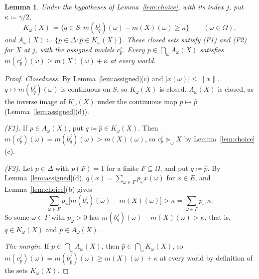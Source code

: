 \documentclass[11pt]{article}
\newtheorem{lemma}[theorem]{Lemma}
\theoremstyle{definition}
\begin{document}
\begin{lemma}\label{lem:witnesses}
Under the hypotheses of Lemma~\ref{lem:choice}, with its index $j$, put $\kappa\coloneqq\gamma/2$,
\[
K_\omega(X)\coloneqq\bigl\{q\in S:m(b^j_q)(\omega)-m(X)(\omega)\ge \kappa\bigr\}\qquad(\omega\in\Omega),
\]
{\color{red}and $A_\omega(X)\coloneqq\{p\in\Delta:\hat p\in K_\omega(X)\}$. These closed sets satisfy (F1) and (F2) for $X$ at $j$, with the assigned models $c^j_p$. Every $p\in\bigcap_\omega A_\omega(X)$ satisfies $m(c^j_p)(\omega)\ge m(X)(\omega)+\kappa$ at every world.}
\end{lemma}
\begin{proof}
\emph{Closedness.} By Lemma~\ref{lem:assigned}(c) and $|x(\omega)|\le\|x\|$, $q\mapsto m(b^j_q)(\omega)$ is continuous on $S$; so $K_\omega(X)$ is closed. {\color{red}$A_\omega(X)$ is closed, as the inverse image of $K_\omega(X)$ under the continuous map $p\mapsto\hat p$ (Lemma~\ref{lem:assigned}(d)).}

{\color{red}\emph{(F1).} If $p\in A_\omega(X)$, put $q\coloneqq\hat p\in K_\omega(X)$. Then $m(c^j_p)(\omega)=m(b^j_q)(\omega)>m(X)(\omega)$, so $c^j_p\succeq_\omega X$ by Lemma~\ref{lem:choice}(c).

\emph{(F2).} Let $p\in\Delta$ with $p(F)=1$ for a finite $F\subseteq\Omega$, and put $q\coloneqq\hat p$. By Lemma~\ref{lem:assigned}(d), $q(x)=\sum_{\omega\in F}p_\omega x(\omega)$ for $x\in E$, and Lemma~\ref{lem:choice}(b) gives
\[
\sum_{\omega\in F}p_\omega\bigl[m(b^j_q)(\omega)-m(X)(\omega)\bigr]>\kappa=\sum_{\omega\in F}p_\omega\,\kappa .
\]
So some $\omega\in F$ with $p_\omega>0$ has $m(b^j_q)(\omega)-m(X)(\omega)>\kappa$, that is, $q\in K_\omega(X)$ and $p\in A_\omega(X)$.

\emph{The margin.} If $p\in\bigcap_\omega A_\omega(X)$, then $\hat p\in\bigcap_\omega K_\omega(X)$, so $m(c^j_p)(\omega)=m(b^j_{\hat p})(\omega)\ge m(X)(\omega)+\kappa$ at every world by definition of the sets $K_\omega(X)$.}
\end{proof}
\end{document}
